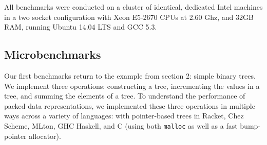 \documentclass[a4paper,english]{lipics-v2016}
\begin{document}
All benchmarks were conducted on a cluster of identical, dedicated Intel
machines in a two socket configuration with Xeon E5-2670 CPUs at 2.60 Ghz, and
32GB RAM, running Ubuntu 14.04 LTS and GCC 5.3.

\subsection{Microbenchmarks}\label{sec:microbench}

Our first benchmarks return to the example from section 2:
simple binary trees. We implement three operations:
constructing a tree, incrementing the values in a tree, and summing
the elements of a tree. To understand the performance of packed data
representations, we implemented these three operations in multiple
ways across a variety of languages: with pointer-based trees in
Racket, Chez Scheme, MLton, GHC Haskell, and C (using both \texttt{malloc} as well
as a fast bump-pointer allocator).
\end{document}
